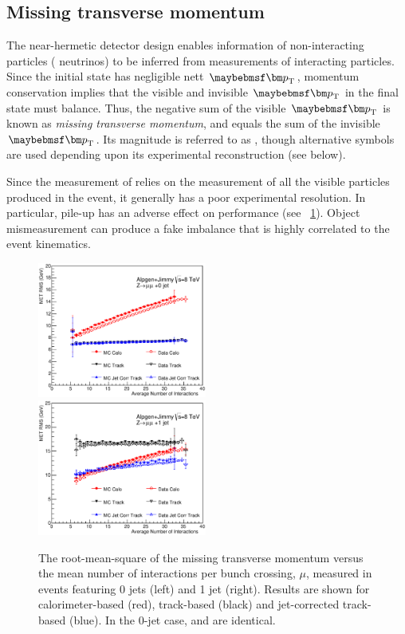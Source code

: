 \subsection{Missing transverse momentum}
\label{sec:objects:met}

The near-hermetic detector design enables information of non-interacting particles (\eg 
neutrinos) to be inferred from measurements of interacting particles. Since the initial 
state has negligible nett $\bvec{p}_{\text{T}}$, momentum conservation implies that the 
visible and invisible $\bvec{p}_{\text{T}}$ in the final state must balance. Thus, 
the negative sum of the visible $\bvec{p}_{\text{T}}$ is known as \textit{missing 
transverse momentum}, and equals the sum of the invisible $\bvec{p}_{\text{T}}$. Its 
magnitude is referred to as \met, though alternative symbols are used depending upon its 
experimental reconstruction (see below).

Since the measurement of \met relies on the measurement of all the visible particles 
produced in the event, it generally has a poor experimental resolution.
In particular, pile-up has an adverse effect on performance (see 
\Figure~\ref{fig:objects:met_resolution}). 
Object mismeasurement can produce a fake imbalance that is highly correlated to the event 
kinematics.

\begin{figure}[t]
	\includegraphics[width=0.495\textwidth,clip=true,trim=0.6cm 0.4cm 1.7cm 1.35cm]{tex/selection/met_rms_0j}
	\hfill
	\includegraphics[width=0.495\textwidth,clip=true,trim=0.6cm 0.4cm 1.7cm 1.35cm]{tex/selection/met_rms_1j}
	\caption{The root-mean-square of the missing transverse momentum versus the mean number 
	of interactions per bunch crossing, $\mu$, measured in \HepProcess{\PZ \HepTo \Pmu\Pmu} 
	events featuring 0 jets (left) and 1 jet (right). Results are shown for 
	calorimeter-based \calomet (red), track-based \trackmet (black) and jet-corrected 
	track-based \corrtrackmet (blue). In the 0-jet case, \trackmet and \corrtrackmet are 
	identical.}
	\label{fig:objects:met_resolution}
\end{figure}

